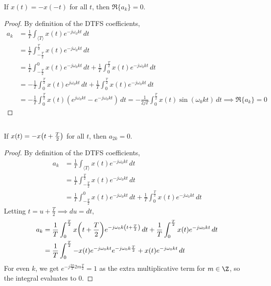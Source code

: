 \documentclass{article}
\begin{document}
\begin{theorem}
    If \(x(t) = -x(-t)\) for all \(t\), then \(\Re\{a_k\} = 0\).
\end{theorem}
\begin{proof}
    By definition of the DTFS coefficients,
    \begin{align}
        a_k &= \frac{1}{T} \int_{\langle T \rangle} x(t) e^{-j \omega_0 k t} \, dt \\
        &= \frac{1}{T} \int_{-\frac{T}{2}}^{\frac{T}{2}} x(t) e^{-j \omega_0 k t} \, dt \\
        &= \frac{1}{T} \int_{-\frac{T}{2}}^0 x(t) e^{-j \omega_0 k t} \, dt + \frac{1}{T} \int_0^{\frac{T}{2}} x(t) e^{-j \omega_0 k t} \, dt \\
        &= -\frac{1}{T} \int_0^{\frac{T}{2}} x(t) e^{j \omega_0 k t} \, dt + \frac{1}{T} \int_0^{\frac{T}{2}} x(t) e^{-j \omega_0 k t} \, dt \\
        &= -\frac{1}{T} \int_0^{\frac{T}{2}} x(t) (e^{j \omega_0 k t} - e^{-j \omega_0 k t}) \, dt = -\frac{1}{2jT} \int_0^{\frac{T}{2}} x(t) \sin(\omega_0 k t) \, dt \implies \Re\{a_k\} = 0
    \end{align}
\end{proof}

\subsection{}

\begin{theorem}
    If \(x(t) = -x\qty(t + \frac{T}{2})\) for all \(t\), then \(a_{2k} = 0\).
\end{theorem}
\begin{proof}
    By definition of the DTFS coefficients,
    \begin{align}
        a_k &= \frac{1}{T} \int_{\langle T \rangle} x(t) e^{-j \omega_0 k t} \, dt \\
        &= \frac{1}{T} \int_{-\frac{T}{2}}^{\frac{T}{2}} x(t) e^{-j \omega_0 k t} \, dt \\
        &= \frac{1}{T} \int_{-\frac{T}{2}}^0 x(t) e^{-j \omega_0 k t} \, dt + \frac{1}{T} \int_0^{\frac{T}{2}} x(t) e^{-j \omega_0 k t} \, dt
    \end{align}
    Letting \(t = u + \frac{T}{2} \implies du = dt\),
    \begin{align}
        a_k &= \frac{1}{T} \int_0^{\frac{T}{2}} x\qty(t + \frac{T}{2}) e^{-j \omega_0 k \qty(t + \frac{T}{2})} \, dt + \frac{1}{T} \int_0^{\frac{T}{2}} x(t) e^{-j \omega_0 k t} \, dt \\
        &= \frac{1}{T} \int_0^{\frac{T}{2}} -x(t) e^{-j \omega_0 k t} e^{-j \omega_0 k \frac{T}{2}} + x(t) e^{-j \omega_0 k t} \, dt
    \end{align}
    For even \(k\), we get \(e^{-j \frac{2\pi}{T} 2m \frac{T}{2}} = 1\) as the extra multiplicative term for \(m \in \Z\), so the integral evaluates to \(0\).
\end{proof}
\end{document}
